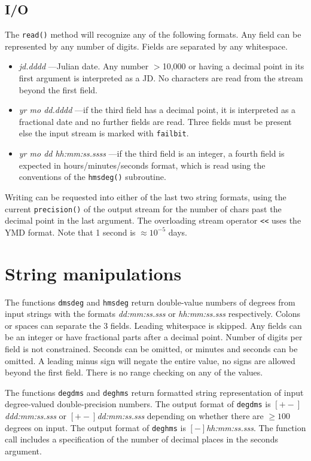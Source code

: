 \documentclass[11pt,preprint,flushrt]{aastex}
\begin{document}
\subsection{I/O}
The {\tt read()} method will recognize any of the following formats.  Any field can be represented by any number of digits.  Fields are separated by any whitespace.
\begin{itemize}
\item {\it jd.dddd} ---Julian date.  Any number $>$10,000 or having a decimal point in its first argument is interpreted as a JD.  No characters are read from the stream beyond the first field.
\item{\it yr mo dd.dddd} ---if the third field has a decimal point, it is interpreted as a fractional date and no further fields are read.  Three fields must be present else the input stream is marked with {\tt failbit}.
\item{\it yr mo dd hh:mm:ss.ssss} ---if the third field is an integer, a fourth field is expected in hours/minutes/seconds format, which is read using the conventions of the {\tt hmsdeg()} subroutine.
\end{itemize}
Writing can be requested into either of the last two string formats, using the current {\tt precision()} of the output stream for the number of chars past the decimal point in the last argument.  The overloading stream operator {\tt <<} uses the YMD format.  Note that 1 second is $\approx10^{-5}$ days.

\section{String manipulations}
The functions {\tt dmsdeg} and {\tt hmsdeg} return double-value numbers of degrees from input strings with the formats {\it dd:mm:ss.sss} or {\it hh:mm:ss.sss} respectively.  
Colons or spaces can separate the 3 fields.  Leading whitespace is skipped.  Any fields can be an integer or have fractional parts after a decimal point.  Number of digits per field is not constrained.  Seconds can be omitted, or minutes and seconds can be omitted.  A leading minus sign will negate the entire value, no signs are allowed beyond the first field.  There is no range checking on any of the values.

The functions {\tt degdms} and {\tt deghms} return formatted string representation of input degree-valued double-precision numbers.  The output format of {\tt degdms}  is {\it $[+-]$ddd:mm:ss.sss} or {\it $[+-]$dd:mm:ss.sss} depending on whether there are $\ge100$ degrees on input. The output format of {\tt deghms}  is {\it $[-]$hh:mm:ss.sss}.  The function call includes a specification of the number of decimal places in the seconds argument.
\end{document}
